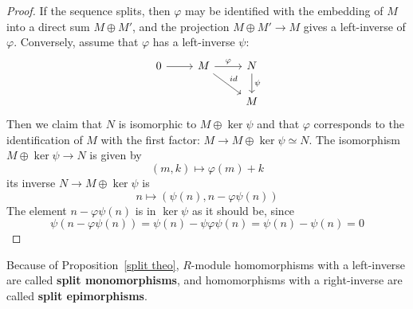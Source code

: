\begin{proof}
If the sequence splits, then $\varphi$ may be identified with the embedding of $M$ into a direct sum $M\oplus M'$, and the projection $M\oplus M'\to M$ gives a left-inverse of $\varphi$. Conversely, assume that $\varphi$ has a left-inverse $\psi$:
\[\begin{tikzcd}
0\ar[r]&M\ar[r,"\varphi"]\ar[rd,"id"]&N\ar[d,"\psi"]\\
&&M
\end{tikzcd}\]
Then we claim that $N$ is isomorphic to $M\oplus\ker\psi$ and that $\varphi$ corresponds to the
identification of $M$ with the first factor: $M\to M\oplus\ker\psi\simeq N$. The isomorphism
$M\oplus\ker\psi\to N$ is given by
\[(m,k)\mapsto\varphi(m)+k\]
its inverse $N\to M\oplus\ker\psi$ is
\[n\mapsto(\psi(n),n-\varphi\psi(n))\]
The element $n-\varphi\psi(n)$ is in $\ker\psi$ as it should be, since
\[\psi(n-\varphi\psi(n))=\psi(n)-\psi\varphi\psi(n)=\psi(n)-\psi(n)=0\]
\end{proof}
Because of Proposition~\ref{split theo}, $R$-module homomorphisms with a left-inverse are called \textbf{split monomorphisms}, and homomorphisms with a right-inverse are called \textbf{split epimorphisms}.
